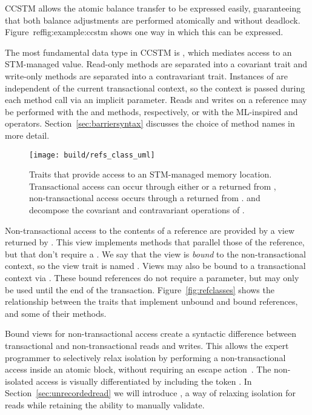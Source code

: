 CCSTM allows the atomic balance transfer to be expressed easily,
guaranteeing that both balance adjustments are performed atomically and
without deadlock.  Figure~ref{fig:example:ccstm} shows one way in which
this can be expressed.

The most fundamental data type in CCSTM is , which mediates
access to an STM-managed value.  Read-only methods are separated into a
covariant  trait and write-only methods are separated into a
contravariant  trait.  Instances of  are independent
of the current transactional context, so the context is passed during
each method call via an implicit parameter.  Reads and writes on a
reference may be performed with the  and  methods,
respectively, or with the ML-inspired  and \code{:=}
operators.  Section~\ref{sec:barriersyntax} discusses the choice of
method names in more detail.

\begin{figure*}
  \centering
  \texttt{[image: build/refs\_class\_uml]}

\caption{Traits that provide access to an STM-managed memory
location.  Transactional access can occur through either 
or a  returned from ,
non-transactional access occurs through a  returned
from .   and 
decompose the covariant and contravariant operations of .}

\label{fig:refsclasses}
\end{figure*}

Non-transactional access to the contents of a reference are provided by
a view returned by .  This view implements methods that
parallel those of the reference, but that don't require a .
We say that the view is \textit{bound} to the non-transactional context,
so the view trait is named .  Views may also be bound
to a transactional context via .  These bound
references do not require a  parameter, but may only be used
until the end of the transaction.  Figure~\ref{fig:refclasses} shows
the  relationship between the traits that implement
unbound and bound references, and some of their methods.

Bound views for non-transactional access create a syntactic difference
between transactional and non-transactional reads and writes.
This allows the expert programmer to selectively relax isolation by
performing a non-transactional access inside an atomic block, without
requiring an escape action~\cite{escapeaction}.  The non-isolated access
is visually differentiated by including the token .  In
Section~\ref{sec:unrecordedread} we will introduce ,
a way of relaxing isolation for reads while retaining the ability to
manually validate.


